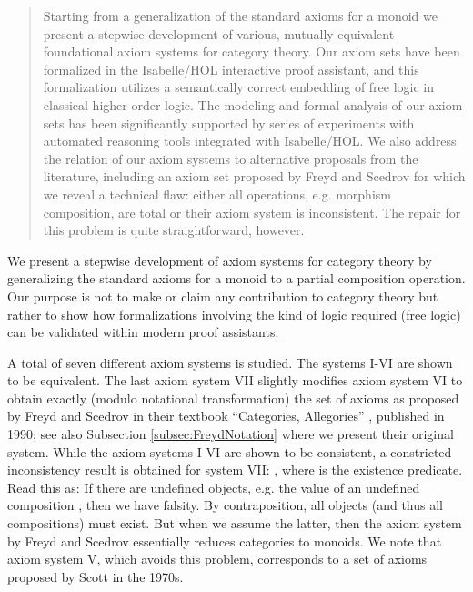 %
\begin{isabellebody}%
%
%
\isadelimtheory
%
\endisadelimtheory
%
\isatagtheory
%
\endisatagtheory
{\isafoldtheory}%
%
\isadelimtheory
%
\endisadelimtheory
%
\begin{isamarkuptext}%
\begin{abstract}
Starting from a generalization of the standard axioms for a monoid we present a stepwise development 
of various, mutually equivalent foundational axiom systems for category theory. 
Our axiom sets have been formalized in the Isabelle/HOL interactive proof assistant, and this
formalization utilizes a semantically correct embedding of free logic 
in classical higher-order logic. The modeling and formal analysis of our axiom sets has been 
significantly supported  by series of experiments with automated reasoning tools integrated 
with Isabelle/HOL. We also address the relation of our axiom systems to alternative proposals 
from the literature, including an axiom set proposed by Freyd and Scedrov for which we reveal 
a technical flaw: either all operations, e.g. morphism composition, are total or 
their axiom system is inconsistent. The repair for this problem is quite straightforward, however. 
\end{abstract}%
\end{isamarkuptext}\isamarkuptrue%
%
\isamarkuptrue%
%
\begin{isamarkuptext}%
We present a stepwise development of axiom systems for category theory by generalizing 
the standard axioms for a monoid to a partial composition operation. Our purpose is not to make or
claim any contribution to category theory but rather to show how formalizations involving the kind 
of logic required (free logic) can be validated within modern proof assistants. 

A total of seven different axiom systems is studied. The systems I-VI are shown to 
be equivalent. The last axiom system VII slightly modifies axiom system VI to obtain exactly (modulo 
notational transformation) the set of axioms as proposed by  Freyd and Scedrov in their textbook
 ``Categories, Allegories'' \cite{FreydScedrov90}, published in 1990; 
see also Subsection \ref{subsec:FreydNotation} where we present their original system.
While the axiom systems I-VI are shown to be  consistent, a constricted inconsistency result is 
obtained for system VII: , where  is the existence 
predicate. Read this as: If there 
are undefined objects, e.g. the value of an undefined composition , then we have falsity.
By contraposition,  all objects (and thus all compositions) must exist. But when we assume the latter,
then the axiom system by Freyd and Scedrov essentially reduces categories to monoids.
We note that axiom system V, which avoids this problem, corresponds to a set of axioms proposed 
by Scott \cite{Scott79} in the 1970s.


\end{isamarkuptext}
\end{isabellebody}
